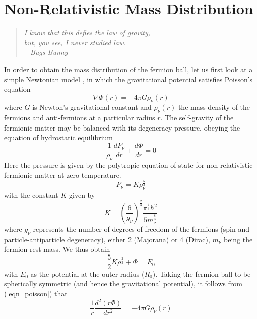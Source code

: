 \section{Non-Relativistic Mass Distribution}
\label{sec_classical}
\begin{quotation}
	\raggedleft \it I know that this defies the law of gravity, \\ but, you see, I never studied law. \\ -- Bugs Bunny
\end{quotation}
In order to obtain the mass distribution of the fermion ball, let us first look at a simple Newtonian model 
\cite{ref_classicalapproach}, in which the gravitational potential satisfies Poisson's equation
\begin{equation}
	\nabla \Phi(r) = -4 \pi G \rho_{\nu}(r)
	\label{eqn_poisson}
\end{equation}
where $G$ is Newton's gravitational constant and $\rho_{\nu}(r)$ the mass density of the fermions and anti-fermions at a
particular radius $r$. The self-gravity of the fermionic matter may be balanced with its degeneracy pressure, obeying the
equation of hydrostatic equilibrium
\begin{equation}
	\frac{1}{\rho_{\nu}} \frac{dP_{\nu}}{dr} + \frac{d\Phi}{dr} = 0
	\label{eqn_hydroequil}
\end{equation}
Here the pressure is given by the polytropic equation of state for non-relativistic fermionic matter at zero temperature.
\begin{equation}
	P_{\nu} = K \rho_{\nu}^{\frac{5}{3}}
	\label{eqn_polytropic}
\end{equation}
with the constant $K$ given by \cite{ref_thomasfermiapproach}
\begin{equation}
	K = \left(\frac{6}{g_{\nu}}\right)^{\frac{2}{3}} \frac{\pi^{\frac{4}{3}} \hbar^2}{5 m_{\nu}^{\frac{8}{3}}}
	\label{eqn_polytropicconstant}
\end{equation}
where $g_{\nu}$ represents the number of degrees of freedom of the fermions (spin and particle-antiparticle degeneracy),
either 2 (Majorana) or 4 (Dirac), $m_{\nu}$ being the fermion rest mass. We thus obtain
\begin{equation}
	\frac{5}{2} K \rho^{\frac{2}{3}} + \Phi = E_0
	\label{eqn_classicalarb1}
\end{equation}
with $E_0$ as the potential at the outer radius ($R_0$). Taking the fermion ball to be spherically symmetric
(and hence the gravitational potential), it follows from (\ref{eqn_poisson}) that
\begin{equation}
	\frac{1}{r}\frac{d^2(r\Phi)}{dr^2} = -4 \pi G \rho_{\nu}(r)
	\label{eqn_classicalarb2}
\end{equation}
